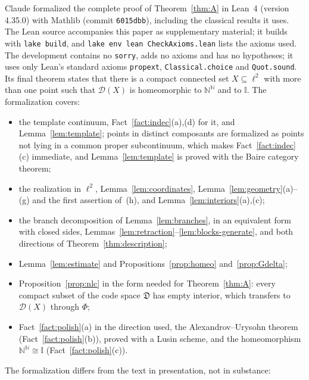 \documentclass[11pt]{amsart}
\theoremstyle{definition}
\theoremstyle{remark}
\newcommand{\D}{\mathcal{D}}
\newcommand{\Dc}{\mathfrak{D}}
\newcommand{\N}{\mathbb{N}}
\newcommand{\I}{\mathbb{I}}
\begin{document}
Claude formalized the complete proof of Theorem~\ref{thm:A} in Lean~4 (version 4.35.0) with Mathlib (commit \texttt{6015dbb}), including the classical results it uses. The Lean source accompanies this paper as supplementary material; it builds with \texttt{lake build}, and \texttt{lake env lean CheckAxioms.lean} lists the axioms used. The development contains no \texttt{sorry}, adds no axioms and has no hypotheses; it uses only Lean's standard axioms \texttt{propext}, \texttt{Classical.choice} and \texttt{Quot.sound}. Its final theorem states that there is a compact connected set $X\subseteq\ell^2$ with more than one point such that $\D(X)$ is homeomorphic to $\N^\N$ and to $\I$. The formalization covers:
\begin{itemize}
\item the template continuum, Fact~\ref{fact:indec}(a),(d) for it, and Lemma~\ref{lem:template}; points in distinct composants are formalized as points not lying in a common proper subcontinuum, which makes Fact~\ref{fact:indec}(c) immediate, and Lemma~\ref{lem:template} is proved with the Baire category theorem;
\item the realization in $\ell^2$, Lemma~\ref{lem:coordinates}, Lemma~\ref{lem:geometry}(a)--(g) and the first assertion of~(h), and Lemma~\ref{lem:interiors}(a),(c);
\item the branch decomposition of Lemma~\ref{lem:branches}, in an equivalent form with closed sides, Lemmas~\ref{lem:retraction}--\ref{lem:blocks-generate}, and both directions of Theorem~\ref{thm:description};
\item Lemma~\ref{lem:estimate} and Propositions~\ref{prop:homeo} and~\ref{prop:Gdelta};
\item Proposition~\ref{prop:nlc} in the form needed for Theorem~\ref{thm:A}: every compact subset of the code space $\Dc$ has empty interior, which transfers to $\D(X)$ through $\Phi$;
\item Fact~\ref{fact:polish}(a) in the direction used, the Alexandrov--Urysohn theorem (Fact~\ref{fact:polish}(b)), proved with a Lusin scheme, and the homeomorphism $\N^\N\cong\I$ (Fact~\ref{fact:polish}(c)).
\end{itemize}
The formalization differs from the text in presentation, not in substance:
\end{document}
